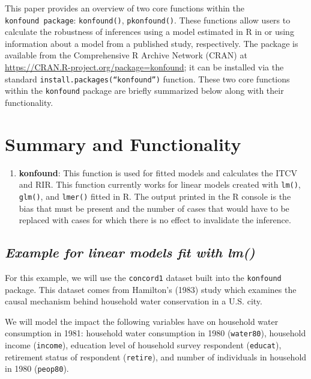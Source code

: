 \documentclass[
]{article}
\providecommand{\tightlist}{%
  \setlength{\itemsep}{0pt}\setlength{\parskip}{0pt}}
\begin{document}
This paper provides an overview of two core functions within the
\texttt{konfound\ package}: \texttt{konfound()}, \texttt{pkonfound()}.
These functions allow users to calculate the robustness of inferences
using a model estimated in R in or using information about a model from
a published study, respectively. The package is available from the
Comprehensive R Archive Network (CRAN) at
\url{https://CRAN.R-project.org/package=konfound}; it can be installed
via the standard \texttt{install.packages(“konfound”)} function. These
two core functions within the \texttt{konfound} package are briefly
summarized below along with their functionality.

\hypertarget{summary-and-functionality}{%
\section{Summary and Functionality}\label{summary-and-functionality}}

\begin{enumerate}
\def\labelenumi{\arabic{enumi}.}
\tightlist
\item
  \textbf{konfound}: This function is used for fitted models and
  calculates the ITCV and RIR. This function currently works for linear
  models created with \texttt{lm()}, \texttt{glm()}, and \texttt{lmer()}
  fitted in R. The output printed in the R console is the bias that must
  be present and the number of cases that would have to be replaced with
  cases for which there is no effect to invalidate the inference.
\end{enumerate}

\hypertarget{example-for-linear-models-fit-with-lm}{%
\subsection{\texorpdfstring{\emph{Example for linear models fit with
lm()}}{Example for linear models fit with lm()}}\label{example-for-linear-models-fit-with-lm}}

For this example, we will use the \texttt{concord1} dataset built into
the \texttt{konfound} package. This dataset comes from Hamilton's (1983)
study which examines the causal mechanism behind household water
conservation in a U.S. city.

We will model the impact the following variables have on household water
consumption in 1981: household water consumption in 1980
(\texttt{water80}), household income (\texttt{income}), education level
of household survey respondent (\texttt{educat}), retirement status of
respondent (\texttt{retire}), and number of individuals in household in
1980 (\texttt{peop80}).
\end{document}
